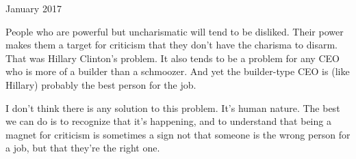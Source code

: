 January 2017

People who are powerful but uncharismatic will tend to be disliked.
Their power makes them a target for criticism that they don't have the
charisma to disarm. That was Hillary Clinton's problem. It also tends to
be a problem for any CEO who is more of a builder than a schmoozer. And
yet the builder-type CEO is (like Hillary) probably the best person for
the job.

I don't think there is any solution to this problem. It's human nature.
The best we can do is to recognize that it's happening, and to
understand that being a magnet for criticism is sometimes a sign not
that someone is the wrong person for a job, but that they're the right
one.

